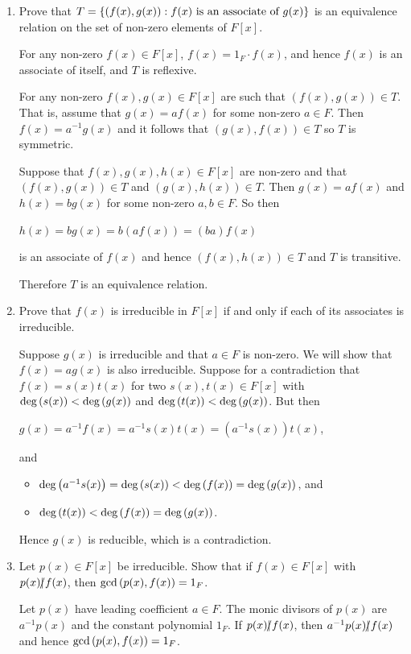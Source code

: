 \documentclass[11pt,fleqn,dvipsnames,usenames]{article}
\begin{document}
\begin{enumerate}
\item Prove that $T = \left\{(f(x),g(x)):f(x)\text{ is an associate of } g(x)\right\}$ is an equivalence relation on the set of non-zero elements of $F[x]$.
\vsmsp

\solution For any non-zero $f(x)\in F[x]$, $f(x) = 1_{F}\cdot f(x)$, and hence $f(x)$ is an associate of itself, and $T$ is reflexive.

For any non-zero $f(x),g(x)\in F[x]$ are such that $(f(x),g(x))\in T$.  That is, assume that $g(x) = af(x)$ for some non-zero $a\in F$.  Then $f(x) = a^{-1}g(x)$ and it follows that $(g(x),f(x))\in T$ so $T$ is symmetric.

Suppose that $f(x),g(x),h(x)\in F[x]$ are non-zero and that $(f(x),g(x))\in T$ and $(g(x),h(x))\in T$.  Then $g(x) = af(x)$ and $h(x) = bg(x)$ for some non-zero $a,b\in F$.  So then
\begin{center}
$h(x) = bg(x) = b(af(x)) = (ba)f(x)$
\end{center}
is an associate of $f(x)$ and hence $(f(x),h(x))\in T$ and $T$ is transitive.
\vsp

Therefore $T$ is an equivalence relation.

\item Prove that $f(x)$ is irreducible in $F[x]$ if and only if each of its associates is irreducible.
\vsmsp

\solution Suppose $g(x)$ is irreducible and that $a\in F$ is non-zero.  We will show that $f(x) = ag(x)$ is also irreducible.  Suppose for a contradiction that $f(x)=s(x)t(x)$ for two $s(x),t(x)\in F[x]$ with $\text{deg}\left(s(x)\right) < \text{deg}\left(g(x)\right)$ and $\text{deg}\left(t(x)\right) < \text{deg}\left(g(x)\right)$.  But then
\begin{center}
$g(x) = a^{-1}f(x) = a^{-1}s(x)t(x) = (a^{-1}s(x))t(x)$,
\end{center}
and
\begin{itemize}
\item $\text{deg}\left(a^{-1}s(x)\right) = \text{deg}\left(s(x)\right) < \text{deg}\left(f(x)\right) = \text{deg}\left(g(x)\right)$, and 
\item $\text{deg}\left(t(x)\right) < \text{deg}\left(f(x)\right) = \text{deg}\left(g(x)\right)$.
\end{itemize}
Hence $g(x)$ is reducible, which is a contradiction.

\item Let $p(x)\in F[x]$ be irreducible.  Show that if $f(x)\in F[x]$ with $p(x)|\kern-0.9ex{/} f(x)$, then $\text{gcd}\left(p(x),f(x)\right) = 1_{F}$.
\vsmsp

\solution Let $p(x)$ have leading coefficient $a\in F$.  The monic divisors of $p(x)$ are $a^{-1}p(x)$ and the constant polynomial $1_{F}$.  If $p(x)|\kern-0.9ex{/} f(x)$, then $a^{-1}p(x)|\kern-0.9ex{/} f(x)$ and hence $\text{gcd}\left(p(x),f(x)\right) = 1_{F}$.


\end{enumerate}
\end{document}

